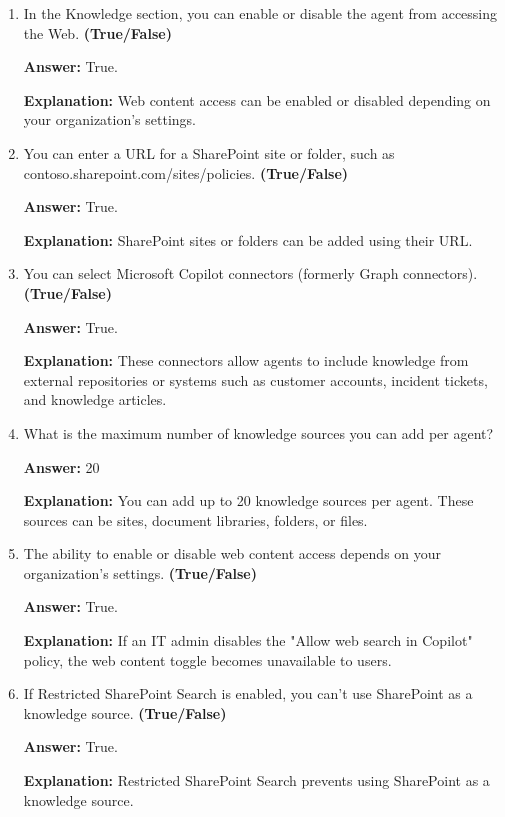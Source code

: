 \documentclass[10pt]{article}
\begin{document}
\begin{enumerate}[leftmargin=*]
\textbf{Answer:} True.

\textbf{Explanation:} You can select folders and file types or add a SharePoint site.

\item In the Knowledge section, you can enable or disable the agent from accessing the Web. \textbf{(True/False)}

\textbf{Answer:} True.

\textbf{Explanation:} Web content access can be enabled or disabled depending on your organization's settings.

\item You can enter a URL for a SharePoint site or folder, such as contoso.sharepoint.com/sites/policies. \textbf{(True/False)}

\textbf{Answer:} True.

\textbf{Explanation:} SharePoint sites or folders can be added using their URL.

\item You can select Microsoft Copilot connectors (formerly Graph connectors). \textbf{(True/False)}

\textbf{Answer:} True.

\textbf{Explanation:} These connectors allow agents to include knowledge from external repositories or systems such as customer accounts, incident tickets, and knowledge articles.

\item What is the maximum number of knowledge sources you can add per agent?

\textbf{Answer:} 20

\textbf{Explanation:} You can add up to 20 knowledge sources per agent. These sources can be sites, document libraries, folders, or files.

\item The ability to enable or disable web content access depends on your organization's settings. \textbf{(True/False)}

\textbf{Answer:} True.

\textbf{Explanation:} If an IT admin disables the "Allow web search in Copilot" policy, the web content toggle becomes unavailable to users.

\item If Restricted SharePoint Search is enabled, you can’t use SharePoint as a knowledge source. \textbf{(True/False)}

\textbf{Answer:} True.

\textbf{Explanation:} Restricted SharePoint Search prevents using SharePoint as a knowledge source.


\end{enumerate}
\end{document}
